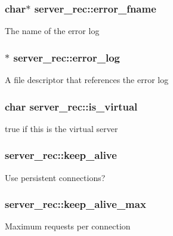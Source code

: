 \subsubsection[{\texorpdfstring{error\+\_\+fname}{error_fname}}]{\setlength{\rightskip}{0pt plus 5cm}char$\ast$ server\+\_\+rec\+::error\+\_\+fname}\hypertarget{structserver__rec_accf73bba23c2e5354dc9a1abdb1aa7c1}{}\label{structserver__rec_accf73bba23c2e5354dc9a1abdb1aa7c1}
The name of the error log 
\subsubsection[{\texorpdfstring{error\+\_\+log}{error_log}}]{$\ast$ server\+\_\+rec\+::error\+\_\+log}\hypertarget{structserver__rec_a6b75cc308c1ea6dc45050badeaca804b}{}\label{structserver__rec_a6b75cc308c1ea6dc45050badeaca804b}
A file descriptor that references the error log 
\subsubsection[{\texorpdfstring{is\+\_\+virtual}{is_virtual}}]{\setlength{\rightskip}{0pt plus 5cm}char server\+\_\+rec\+::is\+\_\+virtual}\hypertarget{structserver__rec_ace39fc136327b4ab9c381ec708d93ad0}{}\label{structserver__rec_ace39fc136327b4ab9c381ec708d93ad0}
true if this is the virtual server 
\subsubsection[{\texorpdfstring{keep\+\_\+alive}{keep_alive}}]{ server\+\_\+rec\+::keep\+\_\+alive}\hypertarget{structserver__rec_a715a217fd606373e0039f81a3e4b654c}{}\label{structserver__rec_a715a217fd606373e0039f81a3e4b654c}
Use persistent connections? 
\subsubsection[{\texorpdfstring{keep\+\_\+alive\+\_\+max}{keep_alive_max}}]{ server\+\_\+rec\+::keep\+\_\+alive\+\_\+max}\hypertarget{structserver__rec_a84f18ce5406ec7b4ded3e230ae75340e}{}\label{structserver__rec_a84f18ce5406ec7b4ded3e230ae75340e}
Maximum requests per connection 
